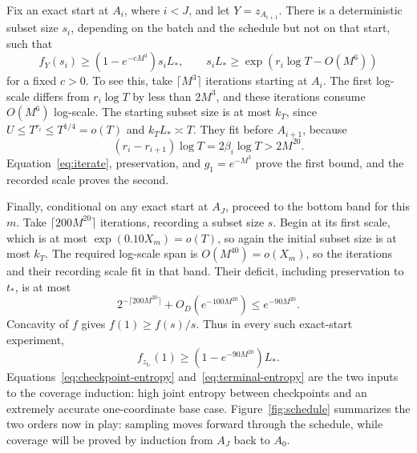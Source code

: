 Fix an exact start at \(A_i\), where \(i<J\), and let
\(Y=z_{A_{i+1}}\).
There is a deterministic subset size \(s_i\), depending on the batch
and the schedule but not on that start, such that
\begin{equation}\label{eq:checkpoint-entropy}
f_Y(s_i)\ge(1-e^{-cM^3})s_iL_*,
\qquad
s_iL_*\ge\exp(r_i\log T-O(M^6))
\end{equation}
for a fixed \(c>0\).
To see this, take \(\lceil M^3\rceil\) iterations starting at \(A_i\).
The first log-scale differs from \(r_i\log T\) by less than \(2M^3\),
and these iterations consume \(O(M^6)\) log-scale.
The starting subset size is at most \(k_T\), since
\(U\le T^{r_i}\le T^{1/4}=o(T)\) and
\(k_TL_*\asymp T\). They fit before \(A_{i+1}\), because
\[
(r_i-r_{i+1})\log T=2\beta_i\log T>2M^{20}.
\]
Equation~\eqref{eq:iterate}, preservation, and \(g_1=e^{-M^3}\)
prove the first bound, and the recorded scale proves the second.

Finally, conditional on any exact start at \(A_J\), proceed to the
bottom band for this \(m\).
Take \(\lceil200M^{20}\rceil\) iterations, recording a subset size \(s\).
Begin at its first scale, which is at most
\(\exp(0.10X_m)=o(T)\), so again the initial subset size is at most
\(k_T\). The required log-scale span is \(O(M^{40})=o(X_m)\), so the
iterations and their recording scale fit in that band. Their deficit, including preservation to \(t_*\),
is at most
\[
2^{-\lceil200M^{20}\rceil}+O_D(e^{-100M^{20}})
\le e^{-90M^{20}}.
\]
Concavity of \(f\) gives \(f(1)\ge f(s)/s\).
Thus in every such exact-start experiment,
\begin{equation}\label{eq:terminal-entropy}
f_{z_{t_*}}(1)\ge(1-e^{-90M^{20}})L_*.
\end{equation}
Equations~\eqref{eq:checkpoint-entropy} and~\eqref{eq:terminal-entropy}
are the two inputs to the coverage induction: high joint entropy
between checkpoints and an extremely accurate one-coordinate base case.
Figure~\ref{fig:schedule} summarizes the two orders now in play:
sampling moves forward through the schedule, while coverage will be
proved by induction from $A_J$ back to $A_0$.

